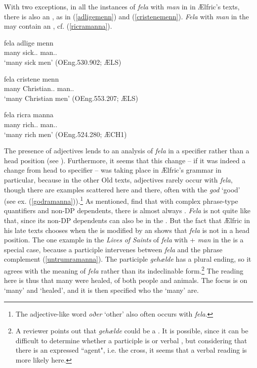 \documentclass[output=paper,colorlinks,citecolor=brown]{langscibook}
\begin{document}
With two exceptions, in all the instances of \textit{fela} with \textit{man} in  in Ælfric’s texts, there is also an , as in (\ref{adligemenn}) and (\ref{cristenemenn}). \textit{Fela} with \textit{man} in the  may contain an , cf. (\ref{ricramanna}).

\ea\label{adligemenn}
\gll fela adlige menn\\
many sick.\NOM.\PL{} man.\NOM.\PL{}\\
\glt ‘many sick men’ (OEng.530.902; ÆLS)
\z

\ea\label{cristenemenn}
\gll fela cristene menn\\
many Christian.\NOM.\PL{} man.\NOM.\PL{}\\
\glt ‘many Christian men’ (OEng.553.207; ÆLS)
\z

\ea\label{ricramanna}
\gll fela ricra manna\\
many rich.\GEN.\PL{} man.\GEN.\PL{}\\
\glt ‘many rich men’ (OEng.524.280; ÆCH1)
\z

The presence of adjectives lends  to an analysis of \textit{fela} in a specifier rather than a head position (see \cite[403]{RoehrsSapp18}). Furthermore, it seems that this change – if it was indeed a change from head to specifier – was taking place in Ælfric’s grammar in particular, because in the other Old  texts, adjectives rarely occur with \textit{fela}, though there are examples scattered here and there, often with the  \textit{god} ‘good’ (see ex. (\ref{godramanna})).\footnote{The adjective-like word \textit{oðer} ‘other’ also often occurs with \textit{fela}.} As mentioned, \citet[398]{RoehrsSapp18} find that with complex phrase-type quantifiers and non-DP dependents, there is almost always . \textit{Fela} is not quite like that, since its non-DP dependents can also be in the . But the fact that Ælfric in his late texts chooses  when the  is modified by an  shows that \textit{fela} is not in a head position. The one example in the \textit{Lives of Saints} of \textit{fela} with  + \textit{man} in the  is a special case, because a participle intervenes between \textit{fela} and the  phrase complement (\ref{untrumramanna}). The participle \textit{gehælde} has a  plural ending, so it agrees with the meaning of \textit{fela} rather than its indeclinable form.\footnote{A reviewer points out that \textit{gehælde} could be a  . It is possible, since it can be difficult to determine whether a participle is  or verbal \citep[vol. I, 649]{Mitchell85}, but considering that there is an expressed ``agent", i.e. the cross, it seems that a verbal reading is more likely here.} The reading here is thus that many were healed, of both people and animals. The focus is on ‘many’ and ‘healed’, and it is then specified who the ‘many’ are. 
\end{document}
